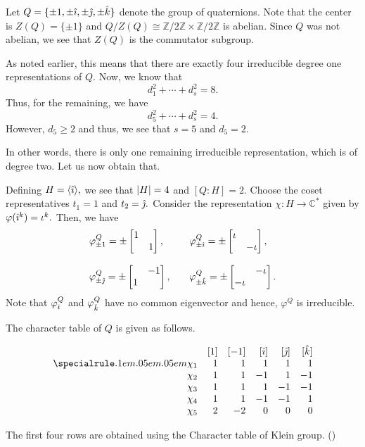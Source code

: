 \begin{ex} \label{ex:inductquaternion}
	Let $Q = \{\pm 1, \pm \hat{\imath}, \pm \hat{\jmath}, \pm \hat{k}\}$ denote the group of quaternions. Note that the center is $Z(Q) = \{\pm 1\}$ and $Q/Z(Q) \cong \mathbb{Z}/2\mathbb{Z} \times \mathbb{Z}/2\mathbb{Z}$ is abelian. Since $Q$ was not abelian, we see that $Z(Q)$ is the commutator subgroup.\footnotemark

	As noted earlier, this means that there are exactly four irreducible degree one representations of $Q.$ Now, we know that
	\begin{equation*} 
		d_1^2 + \cdots + d_s^2 = 8.
	\end{equation*}
	Thus, for the remaining, we have
	\begin{equation*} 
		d_5^2 + \cdots + d_s^2 = 4.
	\end{equation*}
	However, $d_5 \ge 2$ and thus, we see that $s = 5$ and $d_5 = 2.$

	In other words, there is only one remaining irreducible representation, which is of degree two. Let us now obtain that.

	Defining $H = \langle \hat{\imath}\rangle,$ we see that ${\left\lvert H \right\lvert} = 4$ and $[Q : H] = 2.$ Choose the coset representatives $t_1 = 1$ and $t_2 = \hat{\jmath}.$ Consider the representation $\chi : H \to \mathbb{C}^*$ given by $\varphi(\hat{\imath}^k) = \iota^k.$ Then, we have
	\begin{align*} 
		\begin{array}{lll}
		\varphi^Q_{\pm 1} = \pm \begin{bmatrix} 1 &  \\  & 1 \end{bmatrix}, && \varphi^Q_{\pm \hat{\imath}} = \pm \begin{bmatrix} \iota &  \\  & -\iota \end{bmatrix},\\ && \\
		\varphi^Q_{\pm \hat{\jmath}} = \pm \begin{bmatrix}  & -1 \\ 1 &  \end{bmatrix}, && \varphi^Q_{\pm \hat{k}} = \pm \begin{bmatrix}  & -\iota \\ -\iota &  \end{bmatrix}.
		\end{array}
	\end{align*}
	Note that $\varphi^Q_{\hat{\imath}}$ and $\varphi^Q_{\hat{k}}$ have no common eigenvector and hence, $\varphi^Q$ is irreducible.

	The character table of $Q$ is given as follows.

	\captionsetup{type=figure}
	\[\begin{array}{rrrrrr}
		 & [1] & [-1] & [\I] & [\J] & [\K]\\
		\thiccline
		\chi_{1} & 1 & 1 & 1 & 1 & 1\\
		\chi_{2} & 1 & 1 & -1 & 1 & -1\\
		\chi_{3} & 1 & 1 & 1 & -1 & -1 \\
		\chi_{4} & 1 & 1 & -1 & -1 & 1\\
		\chi_{5} & 2 & -2 & 0 & 0 & 0
	\end{array}\]
	 \label{tab:charquat}

	The first four rows are obtained using the Character table of Klein group. ()
\end{ex}

